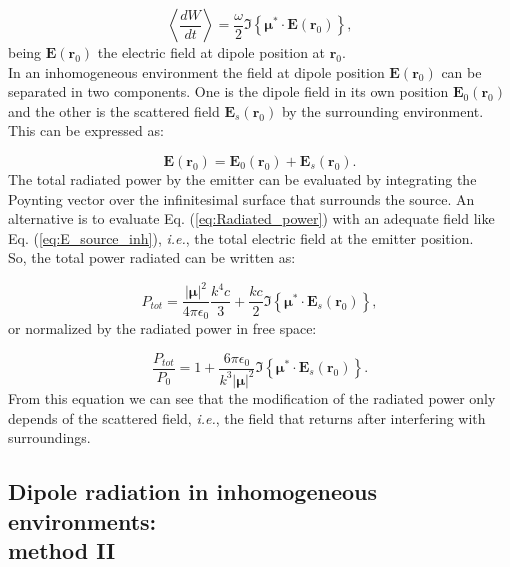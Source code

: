 \begin{equation}
\left<\frac{dW}{dt}\right>=\frac{\omega}{2} \Im\left\{\boldsymbol{\mu}^{*}\cdot\mathbf{E}\left(\mathbf{r}_{0}\right)\right\},\label{eq:Radiated_power}
\end{equation}
being $\mathbf{E}\left(\mathbf{r}_{0}\right)$ the electric field at dipole position at $\mathbf{r}_0$.\\
In an inhomogeneous environment the field at dipole position $\mathbf{E}\left(\mathbf{r}_{0}\right)$ can be separated in two components. One is the dipole field in its own position $\mathbf{E}_{0}\left(\mathbf{r}_0\right)$ and the other is the scattered field  $\mathbf{E}_{s}\left(\mathbf{r}_0\right)$ by the surrounding environment. This can be expressed as:

\begin{equation}
\mathbf{E}\left(\mathbf{r}_{0}\right) = \mathbf{E}_{0}\left(\mathbf{r}_{0}\right) + \mathbf{E}_{s}\left(\mathbf{r}_{0}\right). \label{eq:E_source_inh}
\end{equation}
The total radiated power by the emitter can be evaluated by integrating the Poynting vector over the infinitesimal surface that surrounds the source. An alternative is to evaluate Eq. (\ref{eq:Radiated_power}) with an adequate field like Eq. (\ref{eq:E_source_inh}), \textit{i.e.}, the total electric field at the emitter position.\\
So, the total power radiated can be written as:

\begin{equation}
P_{tot}=\frac{\left|\mathbf{\boldsymbol{\mu}}\right|^2}{4\pi\epsilon_{0}}\frac{k^4c}{3} + \frac{kc}{2}\Im\left\{{\boldsymbol{\mu}^{*}\cdot \mathbf{E}_{s}\left(\mathbf{r}_{0}\right)}\right\}, 
\end{equation}
or normalized by the radiated power in free space:

\begin{equation}
\frac{P_{tot}}{P_{0}}=1 + \frac{6\pi\epsilon_{0}}{k^{3}\left|\boldsymbol{\mu}\right|^2}\Im\left\{{\boldsymbol{\mu}^{*}\cdot \mathbf{E}_{s}\left(\mathbf{r}_{0}\right)}\right\}\label{eq:norm_decay_rate}.
\end{equation}
From this equation we can see that the modification of the radiated power only depends of the scattered field, \textit{i.e.}, the field that returns after interfering with surroundings.

\subsection{Dipole radiation in inhomogeneous environments: \\ method II}

